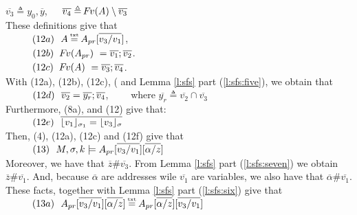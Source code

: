 \begin{description}
$\overline {v_3} \triangleq  y_0,\overline y$,\ \ \ 
$\overline {v_4} \triangleq  \fv(A)\setminus \overline {v_3}$
\\
These definitions give that
\\
$\SPS (12a) \ \  A \txteq \Aop[\overline {v_3/v_1}]$,
\\
$\SPS (12b)  \ \  \fv(\Aop)\ =\overline{v_1}; \overline {v_2}$.
\\ 
$\SPS (12c)  \ \  \fv(A)\ =\overline {v_3};\overline {v_4} $.
\\
With (12a), (12b), (12c), (  and Lemma \ref{l:sfs}  part (\ref{l:sfs:five}), we obtain that \\ 
$\SPS (12d)\ \    \overline {v_2} =   \overline{y_r}; \overline{v_4}$, \ \ \ \ where $\overline{y_r}\triangleq {\overline {v_2}}\cap  \overline {v_3}$
\\
Furthermore, (8a), and (12) give that:\\
$\SPS (12e) \ \  \overline { {\interpret {\sigma_1} {v_1}} = {\interpret {\sigma} {v_3}} }$
\\
Then, (4),  (12a),   (12c) and (12f)  give that\\
$\SPS (13) \ \ \satDAssertFrom M  {\sigma} {k}   {\Aop[\overline{v_3/v_1}][\overline{\alpha/z}]}$\\
Moreover, we have that $\overline z \# \overline {v_3}$. From   Lemma \ref{l:sfs}  part (\ref{l:sfs:seven}) we obtain $\overline z \# \overline {v_1}$. 
And, because $\overline \alpha$ are addresses wile $\overline {v_1}$ are variables, we also have that $\overline \alpha\#\overline {v_1}$.
These facts, together with   Lemma \ref{l:sfs}  part (\ref{l:sfs:six}) give that\\
$\SPS (13a) \ \    \Aop[\overline{v_3/v_1}][\overline{\alpha/z}] \txteq   \Aop[\overline{\alpha/z}]  [\overline{v_3/v_1}] $\\

\end{description}
